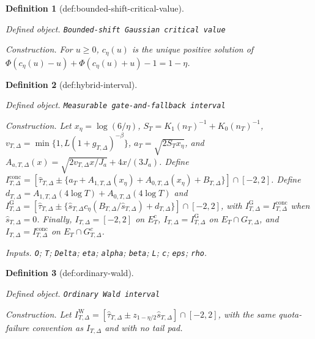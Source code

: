 \documentclass{article}
\newtheorem{definition}{Definition}
\begin{document}
\begin{definition}[def:bounded-shift-critical-value]\label{def:bounded-shift-critical-value}
\par\smallskip\noindent\emph{Defined object.} \texttt{Bounded-\allowbreak{}shift Gaussian critical value}
\par\smallskip\noindent\emph{Construction.} For \(u\geq0\), \(c_\eta(u)\) is the unique positive solution of \(\Phi(c_\eta(u)-u)+\Phi(c_\eta(u)+u)-1=1-\eta\).
\end{definition}

\begin{definition}[def:hybrid-interval]\label{def:hybrid-interval}
\par\smallskip\noindent\emph{Defined object.} \texttt{Measurable gate-\allowbreak{}and-\allowbreak{}fallback interval}
\par\smallskip\noindent\emph{Construction.} Let \(x_\eta=\log(6/\eta)\), \(S_T=K_1(n_T)^{-1}+K_0(n_T)^{-1}\), \(v_{T,\Delta}=\min\{1,L(1+g_{T,\Delta})^{-\beta}\}\), \(a_T=\sqrt{2S_Tx_\eta}\), and \(A_{a,T,\Delta}(x)=\sqrt{2v_{T,\Delta}x/J_a}+4x/(3J_a)\). Define \(I_{T,\Delta}^{\mathrm{conc}}=[\widehat\tau_{T,\Delta}\pm\{a_T+A_{1,T,\Delta}(x_\eta)+A_{0,T,\Delta}(x_\eta)+B_{T,\Delta}\}]\cap[-2,2]\). Define \(d_{T,\Delta}=A_{1,T,\Delta}(4\log T)+A_{0,T,\Delta}(4\log T)\) and \(I_{T,\Delta}^{\mathrm G}=[\widehat\tau_{T,\Delta}\pm\{\widehat s_{T,\Delta}c_\eta(B_{T,\Delta}/\widehat s_{T,\Delta})+d_{T,\Delta}\}]\cap[-2,2]\), with \(I_{T,\Delta}^{\mathrm G}=I_{T,\Delta}^{\mathrm{conc}}\) when \(\widehat s_{T,\Delta}=0\). Finally, \(I_{T,\Delta}=[-2,2]\) on \(E_T^c\), \(I_{T,\Delta}=I_{T,\Delta}^{\mathrm G}\) on \(E_T\cap G_{T,\Delta}\), and \(I_{T,\Delta}=I_{T,\Delta}^{\mathrm{conc}}\) on \(E_T\cap G_{T,\Delta}^c\).
\par\smallskip\noindent\emph{Inputs.} \texttt{O}; \texttt{T}; \texttt{Delta}; \texttt{eta}; \texttt{alpha}; \texttt{beta}; \texttt{L}; \texttt{c}; \texttt{eps}; \texttt{rho}.
\end{definition}

\begin{definition}[def:ordinary-wald]\label{def:ordinary-wald}
\par\smallskip\noindent\emph{Defined object.} \texttt{Ordinary Wald interval}
\par\smallskip\noindent\emph{Construction.} Let \(I_{T,\Delta}^{\mathrm W}=[\widehat\tau_{T,\Delta}\pm z_{1-\eta/2}\widehat s_{T,\Delta}]\cap[-2,2]\), with the same quota-failure convention as \(I_{T,\Delta}\) and with no tail pad.
\end{definition}
\end{document}
